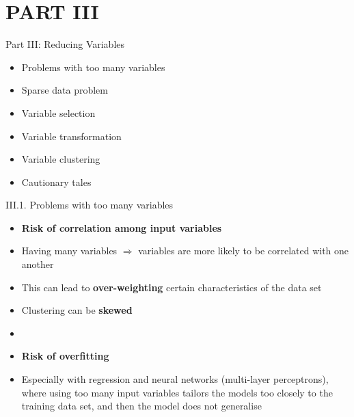 \documentclass[handout]{beamer}
\newcommand{\strong}[1]{\textbf{\color{teal} #1}}
\newcommand{\stronger}[1]{\textbf{\color{purple} #1}}
\begin{document}
\section{PART III}
\begin{frame}{Part III: Reducing Variables}
\begin{itemize}
\item[III.1.] Problems with too many variables
\item[III.2.] Sparse data problem
\item[III.3.] Variable selection
\item[III.4.] Variable transformation
\item[III.5.] Variable clustering
\item[III.6.] Cautionary tales
\end{itemize}
\end{frame}
\begin{frame}{III.1. Problems with too many variables}
\begin{itemize}
\item \strong{Risk of correlation among input variables}
\item[--] Having many variables $\Rightarrow$ variables are more likely to be correlated with one another
\item[--] This can lead to \stronger{over-weighting} certain characteristics of the data set
\item[--] Clustering can be \stronger{skewed}
\item[]
\item \strong{Risk of overfitting}
\item[--] Especially with regression and neural networks (multi-layer perceptrons), where using too many input variables tailors the models too closely to the training data set, and then the model does not generalise
\end{itemize}
\end{frame}
\end{document}
